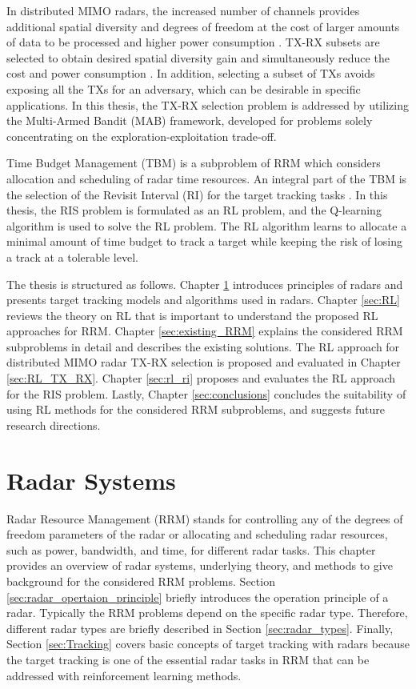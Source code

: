 \documentclass[english, 12pt, a4paper, elec, utf8, a-1b, online]{aaltothesis}
\begin{document}
In distributed MIMO radars, the increased number of channels provides additional spatial diversity and degrees of freedom at the cost of larger amounts of data to be processed and higher power consumption \cite{Haimovich2008, Aittomäki2011}.
TX-RX subsets are selected to obtain desired spatial diversity gain and simultaneously reduce the cost and power consumption \cite{Godrich2011a, Godrich2011, Sun2014}.
In addition, selecting a subset of TXs avoids exposing all the TXs for an adversary, which can be desirable in specific applications.
In this thesis, the TX-RX selection problem is addressed by utilizing the Multi-Armed Bandit (MAB) framework, developed for problems solely concentrating on the exploration-exploitation trade-off. 

Time Budget Management (TBM) is a subproblem of RRM which considers allocation and scheduling of radar time resources.
An integral part of the TBM is the selection of the Revisit Interval (RI) for the target tracking tasks \cite{Cohen1986, Gardner1988, Munu1992, ChengTing2007, Baek2010, Watson1993, Charlish2015, Keuk1975, Shin1995, Benoudnine2006}.
In this thesis, the RIS problem is formulated as an RL problem, and the Q-learning algorithm is used to solve the RL problem.
The RL algorithm learns to allocate a minimal amount of time budget to track a target while keeping the risk of losing a track at a tolerable level.

The thesis is structured as follows. 
Chapter \ref{sec:background} introduces principles of radars and presents target tracking models and algorithms used in radars.
Chapter \ref{sec:RL} reviews the theory on RL that is important to understand the proposed RL approaches for RRM. 
Chapter \ref{sec:existing_RRM} explains the considered RRM subproblems in detail and describes the existing solutions.
The RL approach for distributed MIMO radar TX-RX selection is proposed and evaluated in Chapter \ref{sec:RL_TX_RX}. 
Chapter \ref{sec:rl_ri} proposes and evaluates the RL approach for the RIS problem.
Lastly, Chapter \ref{sec:conclusions} concludes the suitability of using RL methods for the considered RRM subproblems, and suggests future research directions. 


\clearpage
\section{Radar Systems}\label{sec:background}

Radar Resource Management (RRM) stands for controlling any of the degrees of freedom parameters of the radar or allocating and scheduling radar resources, such as power, bandwidth, and time, for different radar tasks.
This chapter provides an overview of radar systems, underlying theory, and methods to give background for the considered RRM problems.
Section \ref{sec:radar_opertaion_principle} briefly introduces the operation principle of a radar.
Typically the RRM problems depend on the specific radar type. 
Therefore, different radar types are briefly described in Section \ref{sec:radar_types}. 
Finally, Section \ref{sec:Tracking} covers basic concepts of target tracking with radars because the target tracking is one of the essential radar tasks in RRM that can be addressed with reinforcement learning methods.
\end{document}
